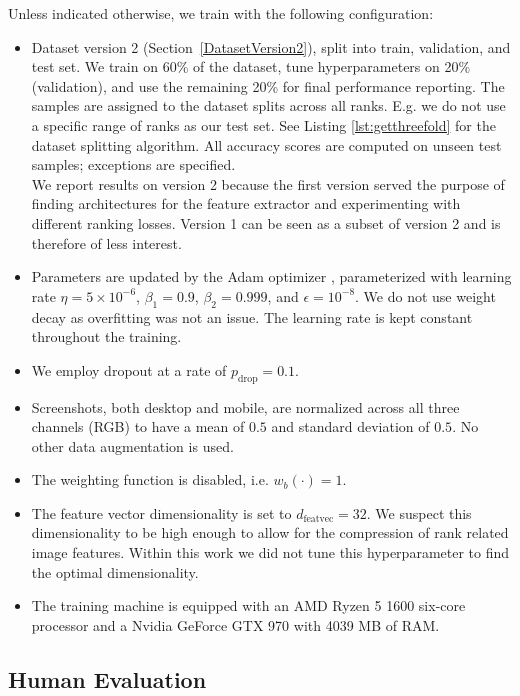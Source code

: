 Unless indicated otherwise, we train with the following configuration:
\begin{itemize}
    \item Dataset version 2 (Section~\ref{DatasetVersion2}), split into train, validation, and test set. We train on 60\% of the dataset, tune hyperparameters on 20\% (validation), and use the remaining 20\% for final performance reporting. The samples are assigned to the dataset splits across all ranks. E.g. we do not use a specific range of ranks as our test set. See Listing \ref{lst:getthreefold} for the dataset splitting algorithm. All accuracy scores are computed on unseen test samples; exceptions are specified.\\
    We report results on version 2 because the first version served the purpose of finding architectures for the feature extractor and experimenting with different ranking losses. Version 1 can be seen as a subset of version 2 and is therefore of less interest.
    \item Parameters are updated by the Adam optimizer \cite{kingma2014:adam}, parameterized with learning rate $\eta=5\times10^{-6}$, $\beta_1=0.9$, $\beta_2=0.999$, and $\epsilon=10^{-8}$. We do not use weight decay as overfitting was not an issue. The learning rate is kept constant throughout the training.
    \item We employ dropout \cite{srivastava2014:dropout} at a rate of $p_\text{drop}=0.1$.
    \item Screenshots, both desktop and mobile, are normalized across all three channels (RGB) to have a mean of $0.5$ and standard deviation of $0.5$. No other data augmentation is used.
    \item The weighting function is disabled, i.e. $w_b(\cdot)=1$.
    \item The feature vector dimensionality is set to $d_\text{featvec}=32$. We suspect this dimensionality to be high enough to allow for the compression of rank related image features. Within this work we did not tune this hyperparameter to find the optimal dimensionality.
    \item The training machine is equipped with an AMD Ryzen 5 1600 six-core processor and a Nvidia GeForce GTX 970 with 4039 MB of RAM.
\end{itemize}

\subsection{Human Evaluation}

